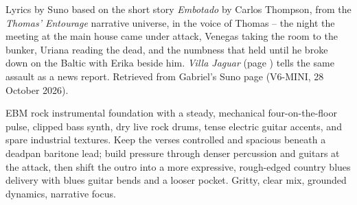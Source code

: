 

\label{sec:little-guajiro}
\begin{notes}
Lyrics by Suno based on the short story \emph{Embotado} by Carlos Thompson, from the \emph{Thomas' Entourage} narrative universe, in the voice of Thomas -- the night the meeting at the main house came under attack, Venegas taking the room to the bunker, Uriana reading the dead, and the numbness that held until he broke down on the Baltic with Erika beside him. \emph{Villa Jaguar} (page \pageref{sec:villa-jaguar}) tells the same assault as a news report. Retrieved from Gabriel's Suno page (V6-MINI, 28 October 2026).
\end{notes}
\begin{style}
EBM rock instrumental foundation with a steady, mechanical four-on-the-floor pulse, clipped bass synth, dry live rock drums, tense electric guitar accents, and spare industrial textures. Keep the verses controlled and spacious beneath a deadpan baritone lead; build pressure through denser percussion and guitars at the attack, then shift the outro into a more expressive, rough-edged country blues delivery with blues guitar bends and a looser pocket. Gritty, clear mix, grounded dynamics, narrative focus.
\end{style}
